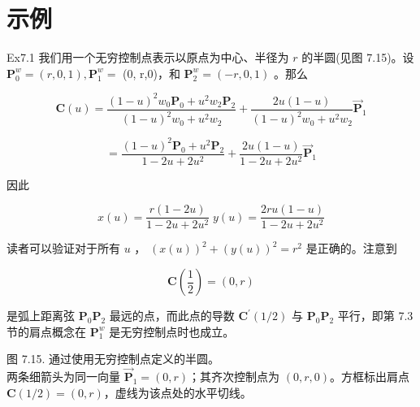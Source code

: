 \documentclass[../main.tex]{subfiles}
\begin{document}
\section*{示例}

Ex7.1 我们用一个无穷控制点表示以原点为中心、半径为 \(r\) 的半圆(见图 7.15)。设 \({\mathbf{P}}_{0}^{w} = \left( {r,0,1}\right) ,{\mathbf{P}}_{1}^{w} =\) (0, r,0)，和 \({\mathbf{P}}_{2}^{w} = \left( {-r,0,1}\right)\) 。那么

\[
\mathbf{C}\left( u\right)  = \frac{{\left( 1 - u\right) }^{2}{w}_{0}{\mathbf{P}}_{0} + {u}^{2}{w}_{2}{\mathbf{P}}_{2}}{{\left( 1 - u\right) }^{2}{w}_{0} + {u}^{2}{w}_{2}} + \frac{{2u}\left( {1 - u}\right) }{{\left( 1 - u\right) }^{2}{w}_{0} + {u}^{2}{w}_{2}}{\overrightarrow{\mathbf{P}}}_{1}
\]

\[
= \frac{{\left( 1 - u\right) }^{2}{\mathbf{P}}_{0} + {u}^{2}{\mathbf{P}}_{2}}{1 - {2u} + 2{u}^{2}} + \frac{{2u}\left( {1 - u}\right) }{1 - {2u} + 2{u}^{2}}{\overrightarrow{\mathbf{P}}}_{1}
\]





因此

\[
x\left( u\right)  = \frac{r\left( {1 - {2u}}\right) }{1 - {2u} + 2{u}^{2}}\;y\left( u\right)  = \frac{{2ru}\left( {1 - u}\right) }{1 - {2u} + 2{u}^{2}}
\]

读者可以验证对于所有 \(u\) ， \({\left( x\left( u\right) \right) }^{2} + {\left( y\left( u\right) \right) }^{2} = {r}^{2}\) 是正确的。注意到

\[
\mathbf{C}\left( \frac{1}{2}\right)  = \left( {0,r}\right)
\]

是弧上距离弦 \({\mathbf{P}}_{0}{\mathbf{P}}_{2}\) 最远的点，而此点的导数 \({\mathbf{C}}^{\prime }\left( {1/2}\right)\) 与 \({\mathbf{P}}_{0}{\mathbf{P}}_{2}\) 平行，即第 7.3 节的肩点概念在 \({\mathbf{P}}_{1}^{w}\) 是无穷控制点时也成立。

\begin{center}
\begin{minipage}{20cm}
\vspace*{.6\baselineskip}
\centering
{}
\par\smallskip
图 7.15. 通过使用无穷控制点定义的半圆。\\
两条细箭头为同一向量 $\overrightarrow{\mathbf P}_1=(0,r)$；其齐次控制点为 $(0,r,0)$。方框标出肩点 $\mathbf C(1/2)=(0,r)$，虚线为该点处的水平切线。
\end{minipage}
\end{center}
\end{document}
